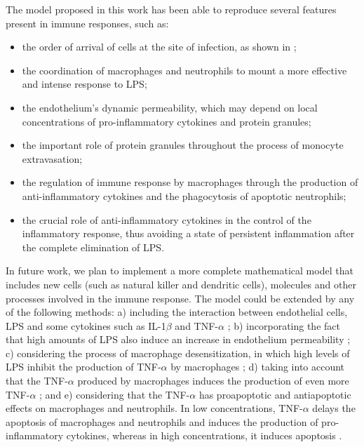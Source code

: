\documentclass[10pt]{bmc_article}
\newenvironment{bmcformat}{\baselineskip20pt\sloppy\setboolean{publ}{false}}{\baselineskip20pt\sloppy}
\begin{document}
\begin{bmcformat}
The model proposed in this work has been able to reproduce several features present in immune responses, such as:

\begin{itemize}
\item the order of arrival of cells at the site of infection, as shown in \cite{Meszaros1999}; 
\item the coordination of macrophages and neutrophils to mount a more effective and intense response to LPS; 
\item the endothelium's dynamic permeability, which may depend on local concentrations of pro-inflammatory cytokines and protein granules; 
\item the important role of protein granules throughout the process of monocyte extravasation; 
\item the regulation of immune response by macrophages through the production of anti-inflammatory cytokines and the phagocytosis of 
apoptotic neutrophils; 
\item the crucial role of anti-inflammatory cytokines in the control of the inflammatory response, thus avoiding a state of persistent 
inflammation after the complete elimination of LPS. 
\end{itemize}

In future work, we plan to implement a more complete mathematical model that includes new cells (such as natural killer and dendritic 
cells), molecules and other processes involved in the immune response. The model could be extended by any of the following methods: 
a) including the interaction between endothelial cells, LPS and some cytokines such as IL-1$\beta$ and TNF-$\alpha$ \cite{Nooteboom2005}; 
b) incorporating the fact that high amounts of LPS also induce an increase in endothelium permeability \cite{Nooteboom2005}; 
c) considering the process of macrophage desensitization, in which high levels of LPS inhibit the production of TNF-$\alpha$ by 
macrophages \cite{Berg2001}; d) taking into account that the TNF-$\alpha$ produced by macrophages induces the production of even 
more TNF-$\alpha$ \cite{Sompayrac2008}; and e) considering that the TNF-$\alpha$ has proapoptotic and antiapoptotic effects on 
macrophages and neutrophils. In low concentrations, TNF-$\alpha$ delays the apoptosis of macrophages and neutrophils and induces 
the production of pro-inflammatory cytokines, whereas in high concentrations, it induces apoptosis \cite{Berg2001}.


\end{bmcformat}
\end{document}
